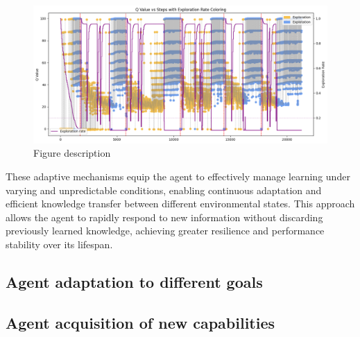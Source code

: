 \begin{figure}
    \centering
    \includegraphics[width=\textwidth]{figures/epsilon.png}
    \caption{Figure description}
    \label{fig:epsilon}
\end{figure}

These adaptive mechanisms equip the agent to effectively manage learning under varying and unpredictable conditions, enabling continuous adaptation and efficient knowledge transfer between different environmental states. This approach allows the agent to rapidly respond to new information without discarding previously learned knowledge, achieving greater resilience and performance stability over its lifespan. 

\subsection{Agent adaptation to different goals}


\subsection{Agent acquisition of new capabilities}


\endinput

